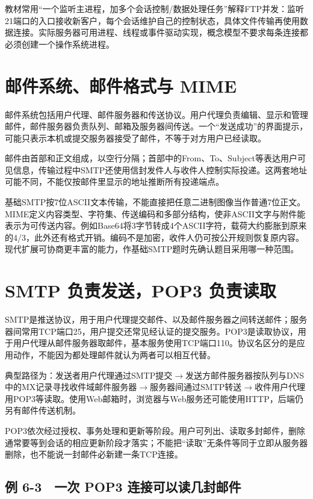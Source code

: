 教材常用``一个监听主进程，加多个会话控制/数据处理任务''解释FTP并发：监听21端口的入口接收新客户，每个会话维护自己的控制状态，具体文件传输再使用数据连接。实际服务器可用进程、线程或事件驱动实现，概念模型不要求每条连接都必须创建一个操作系统进程。

\section{邮件系统、邮件格式与 MIME}\label{CN06-05}

邮件系统包括用户代理、邮件服务器和传送协议。用户代理负责编辑、显示和管理邮件，邮件服务器负责队列、邮箱及服务器间传送。一个``发送成功''的界面提示，可能只表示本机或提交服务器接受了邮件，不等于对方用户已经读取。

邮件由首部和正文组成，以空行分隔；首部中的From、To、Subject等表达用户可见信息，传输过程中SMTP还使用信封发件人与收件人控制实际投递。这两套地址可能不同，不能仅按邮件里显示的地址推断所有投递端点。

基础SMTP按7位ASCII文本传输，不能直接把任意二进制图像当作普通7位正文。MIME定义内容类型、字符集、传送编码和多部分结构，使非ASCII文字与附件能表示为可传送内容。例如Base64将3字节转成4个ASCII字符，载荷大约膨胀到原来的4/3，此外还有格式开销。编码不是加密，收件人仍可按公开规则恢复原内容。现代扩展可协商更丰富的能力，作基础SMTP题时先确认题目采用哪一种范围。

\section{SMTP 负责发送，POP3 负责读取}\label{CN06-06}

SMTP是推送协议，用于用户代理提交邮件、以及邮件服务器之间转送邮件；服务器间常用TCP端口25，用户提交还常见经认证的提交服务。POP3是读取协议，用于用户代理从邮件服务器取邮件，基本服务使用TCP端口110。协议名区分的是应用动作，不能因为都处理邮件就认为两者可以相互代替。

典型路径为：发送者用户代理通过SMTP提交\ensuremath{\to}发送方邮件服务器按队列与DNS中的MX记录寻找收件域邮件服务器\ensuremath{\to}服务器间通过SMTP转送\ensuremath{\to}收件用户代理用POP3等读取。使用Web邮箱时，浏览器与Web服务还可能使用HTTP，后端仍另有邮件传送机制。

POP3依次经过授权、事务处理和更新等阶段。用户可列出、读取多封邮件，删除通常要等到会话的相应更新阶段才落实；不能把``读取''无条件等同于立即从服务器删除，也不能说一封邮件必新建一条TCP连接。

\subsection{例 6-3　一次 POP3 连接可以读几封邮件}\label{CN06-ex3}

